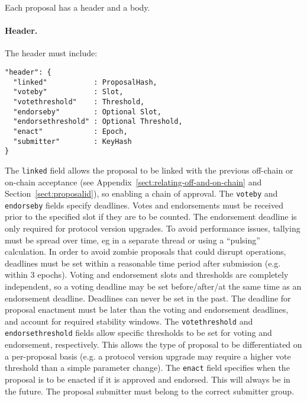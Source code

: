 Each proposal has a header and a body.  %

\paragraph{Header.} The header must include:

\begin{verbatim}
"header": {
  "linked"           : ProposalHash,
  "voteby"           : Slot,
  "votethreshold"    : Threshold,
  "endorseby"        : Optional Slot,
  "endorsethreshold" : Optional Threshold,
  "enact"            : Epoch,
  "submitter"        : KeyHash
}
\end{verbatim}

The \texttt{linked} field allows the proposal to be linked with the previous off-chain or on-chain acceptance (see Appendix~\ref{sect:relating-off-and-on-chain} and Section~\ref{sect:proposalid}), so enabling a chain of approval.  The \texttt{voteby} and \texttt{endorseby} fields specify deadlines.
Votes and endorsements must be received prior to the specified slot if they are to be counted.  The endorsement deadline is only required for protocol version upgrades.
To avoid performance issues, tallying must be spread over time, eg in a separate thread or using a ``pulsing'' calculation.
In order to avoid zombie proposals that could disrupt operations, deadlines must be set within a reasonable time period after submission (e.g. within 3 epochs).
Voting and endorsement slots and thresholds are completely independent, so a voting deadline may be set before/after/at the same time as an endorsement deadline.
Deadlines can never be set in the past.
The deadline for proposal enactment must be later than the  voting and endorsement deadlines, and account for required stability windows.
%
The \texttt{votethreshold} and \texttt{endorsethreshold} fields allow specific thresholds to be set for voting and endorsement, respectively.  This allows the type of proposal to be differentiated on a per-proposal basis
(e.g. a protocol version upgrade may require a higher vote threshold than a simple parameter change).
%
The \texttt{enact} field specifies when the proposal is to be enacted if it is approved and endorsed.  This will always be in the future.
%
The proposal submitter must belong to the correct submitter group.  

